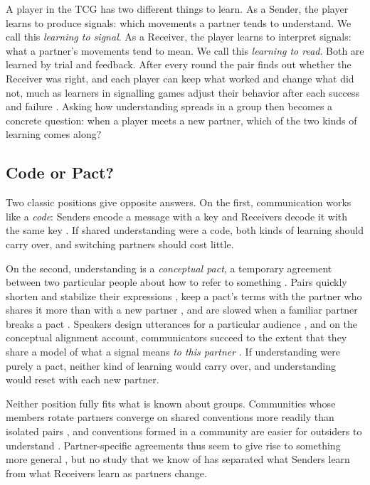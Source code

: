 \documentclass[stu,11pt,floatsintext,donotrepeattitle]{apa7}
\begin{document}
A player in the TCG has two different things to learn. As a Sender, the player learns to produce signals: which movements a partner tends to understand. We call this \emph{learning to signal}. As a Receiver, the player learns to interpret signals: what a partner's movements tend to mean. We call this \emph{learning to read}. Both are learned by trial and feedback. After every round the pair finds out whether the Receiver was right, and each player can keep what worked and change what did not, much as learners in signalling games adjust their behavior after each success and failure \parencite{skyrms2010}. Asking how understanding spreads in a group then becomes a concrete question: when a player meets a new partner, which of the two kinds of learning comes along?

\subsection{Code or Pact?}

Two classic positions give opposite answers. On the first, communication works like a \emph{code}: Senders encode a message with a key and Receivers decode it with the same key \parencite[as critiqued by][]{stolk2016}. If shared understanding were a code, both kinds of learning should carry over, and switching partners should cost little.

On the second, understanding is a \emph{conceptual pact}, a temporary agreement between two particular people about how to refer to something \parencite{brennan1996,garrod1987}. Pairs quickly shorten and stabilize their expressions \parencite{clark1986}, keep a pact's terms with the partner who shares it more than with a new partner \parencite{brennan1996}, and are slowed when a familiar partner breaks a pact \parencite{metzing2003}. Speakers design utterances for a particular audience \parencite{clark1982}, and on the conceptual alignment account, communicators succeed to the extent that they share a model of what a signal means \emph{to this partner} \parencite{stolk2016,stolk2020}. If understanding were purely a pact, neither kind of learning would carry over, and understanding would reset with each new partner.

Neither position fully fits what is known about groups. Communities whose members rotate partners converge on shared conventions more readily than isolated pairs \parencite{garrod1994,fay2010}, and conventions formed in a community are easier for outsiders to understand \parencite{fay2008}. Partner-specific agreements thus seem to give rise to something more general \parencite{hawkins2023}, but no study that we know of has separated what Senders learn from what Receivers learn as partners change.
\end{document}
